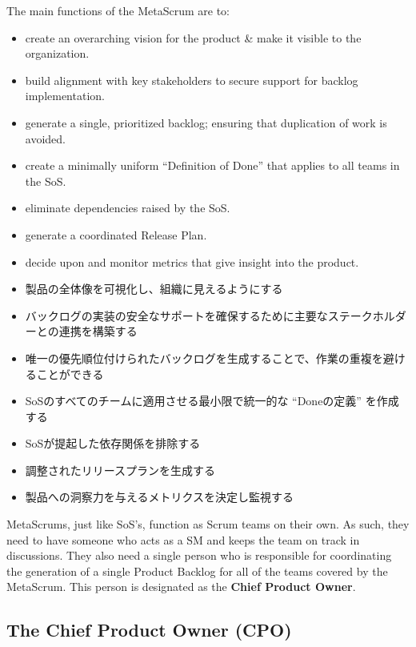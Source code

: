 \documentclass[12pt,a4paper,parskip=full]{scrartcl}
\begin{document}
The main functions of the MetaScrum are to:
\begin{itemize}
\item create an overarching vision for the product \& make it visible to
the organization.
\item build alignment with key stakeholders to secure support for backlog
implementation.
\item generate a single, prioritized backlog; ensuring that duplication of
work is avoided.
\item create a minimally uniform ``Definition of Done'' that applies to all teams in
the SoS.
\item eliminate dependencies raised by the SoS.
\item generate a coordinated Release Plan.
\item decide upon and monitor metrics that give insight into the product.
\end{itemize}
\fi
\begin{itemize}
\item 製品の全体像を可視化し、組織に見えるようにする
\item バックログの実装の安全なサポートを確保するために主要なステークホルダーとの連携を構築する
\item 唯一の優先順位付けられたバックログを生成することで、作業の重複を避けることができる
\item SoSのすべてのチームに適用させる最小限で統一的な ``Doneの定義'' を作成する
\item SoSが提起した依存関係を排除する
\item 調整されたリリースプランを生成する
\item 製品への洞察力を与えるメトリクスを決定し監視する
\end{itemize}
MetaScrums, just like SoS's, function as Scrum teams on their own. As such,
they need to have someone who acts as a SM and keeps the team on track in
discussions. They also need a single person who is responsible for coordinating the
generation of a single Product Backlog for all of the teams covered by the
MetaScrum. This person is designated as the \textbf{Chief Product Owner}.

\subsection{The Chief Product Owner (CPO)}
\fi
\end{document}
